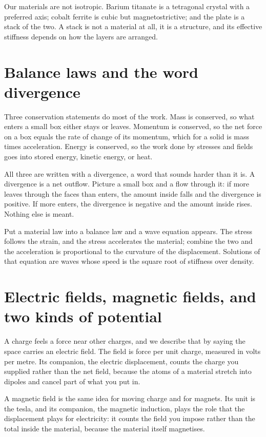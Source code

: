\documentclass[11pt]{article}
\begin{document}
Our materials are not isotropic. Barium titanate is a tetragonal crystal with a preferred axis; cobalt ferrite
is cubic but magnetostrictive; and the plate is a stack of the two. A stack is not a material at all, it is a
structure, and its effective stiffness depends on how the layers are arranged.

\section{Balance laws and the word divergence}

Three conservation statements do most of the work. Mass is conserved, so what enters a small box either stays
or leaves. Momentum is conserved, so the net force on a box equals the rate of change of its momentum, which
for a solid is mass times acceleration. Energy is conserved, so the work done by stresses and fields goes into
stored energy, kinetic energy, or heat.

All three are written with a divergence, a word that sounds harder than it is. A divergence is a net outflow.
Picture a small box and a flow through it: if more leaves through the faces than enters, the amount inside
falls and the divergence is positive. If more enters, the divergence is negative and the amount inside rises.
Nothing else is meant.

Put a material law into a balance law and a wave equation appears. The stress follows the strain, and the
stress accelerates the material; combine the two and the acceleration is proportional to the curvature of the
displacement. Solutions of that equation are waves whose speed is the square root of stiffness over density.

\section{Electric fields, magnetic fields, and two kinds of potential}

A charge feels a force near other charges, and we describe that by saying the space carries an electric field.
The field is force per unit charge, measured in volts per metre. Its companion, the electric displacement,
counts the charge you supplied rather than the net field, because the atoms of a material stretch into dipoles
and cancel part of what you put in.

A magnetic field is the same idea for moving charge and for magnets. Its unit is the tesla, and its companion,
the magnetic induction, plays the role that the displacement plays for electricity: it counts the field you
impose rather than the total inside the material, because the material itself magnetises.
\end{document}
